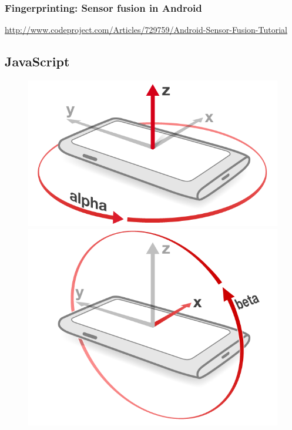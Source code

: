 \subsubsection{Fingerprinting: Sensor fusion in Android}
\url{http://www.codeproject.com/Articles/729759/Android-Sensor-Fusion-Tutorial}

\subsection{JavaScript}
\begin{figure}[H]
  \hspace{-2cm}
  \centering
  \begin{minipage}[c]{.23\textwidth}
    \centering
    \includegraphics[scale=0.2]{img/device-alpha}
  \end{minipage}
  \hspace{1.5cm}
  \begin{minipage}[c]{.23\textwidth}
    \centering
    \includegraphics[scale=0.2]{img/device-beta}

\end{minipage}
\end{figure}
